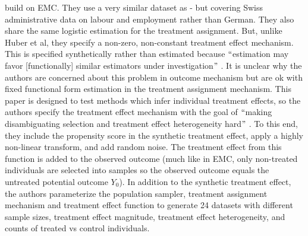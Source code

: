 \documentclass[../main.tex]{subfiles}
\begin{document}
\vspace{\baselineskip}
\textcite{Knaus2018MachineEvidence} build on EMC. They use a very similar dataset as \textcite{Huber2013TheScore} - but covering Swiss administrative data on labour and employment rather than German. They also share the same logistic estimation for the treatment assignment. But, unlike Huber et al, they specify a non-zero, non-constant treatment effect mechanism. This is specified synthetically rather than estimated because $``$estimation may favor [functionally] similar estimators under investigation$"$ . It is unclear why the authors are concerned about this problem in outcome mechanism but are ok with fixed functional form estimation in the treatment assignment mechanism. This paper is designed to test methods which infer individual treatment effects, so the authors specify the treatment effect mechanism with the goal of $``$making disambiguating selection and treatment effect heterogeneity hard$"$ . To this end, they include the propensity score in the synthetic treatment effect, apply a highly non-linear transform, and add random noise. The treatment effect from this function is added to the observed outcome (much like in EMC, only non-treated individuals are selected into samples so the observed outcome equals the untreated potential outcome  \( Y_{0} \)). In addition to the synthetic treatment effect, the authors parameterize the population sampler, treatment assignment mechanism and treatment effect function to generate 24 datasets with different sample sizes, treatment effect magnitude, treatment effect heterogeneity, and counts of treated vs control individuals.\par


\vspace{\baselineskip}

\vspace{\baselineskip}


\end{document}
